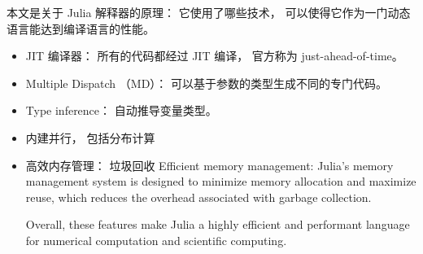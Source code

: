 
\begin{issues}
\issueDraft
\end{issues}

本文是关于 Julia 解释器的原理： 它使用了哪些技术， 可以使得它作为一门动态语言能达到编译语言的性能。

\begin{itemize}
\item JIT 编译器： 所有的代码都经过 JIT 编译， 官方称为 just-ahead-of-time。
\item Multiple Dispatch （MD）： 可以基于参数的类型生成不同的专门代码。
\item Type inference： 自动推导变量类型。
\item 内建并行， 包括分布计算
\item 高效内存管理： 垃圾回收
Efficient memory management: Julia's memory management system is designed to minimize memory allocation and maximize reuse, which reduces the overhead associated with garbage collection.

Overall, these features make Julia a highly efficient and performant language for numerical computation and scientific computing.
\end{itemize}


